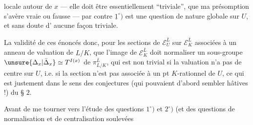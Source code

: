 locale autour de $x$ --- elle doit être essentiellement ``triviale'', que ma présomption s'avère vraie ou fausse --- par contre $\underline{1}^\circ)$ est une question de nature globale sur $U$, et sans doute d' aucune façon triviale.

 La validité de ces énoncés   donc, pour les sections de $\mathcal E_U^{\bar L}$ sur $\mathcal E_K^{\bar L}$ associées à un anneau de valuation de $L/K$,  que l'image de $\mathcal E_K^{\bar L}$ doit normaliser un  sous-groupe $\unsure{\Delta_x|\bar\Delta_x}\simeq T^{I(x)}$ de $\pi_{L/K}^{\bar L}$, qui est non trivial si la valuation n'a pas de centre sur $U$, i.e. si la section n'est pas associée à un pt $K$-rationnel de $U$, ce qui est justement dans le sens des conjectures (qui pouvaient d'abord sembler hâtives !) du § $2$.

Avant de me tourner vers l'étude des questions $1^\circ)$ et $2^\circ)$ (et  des questions de normalisation et de centralisation soulevées
